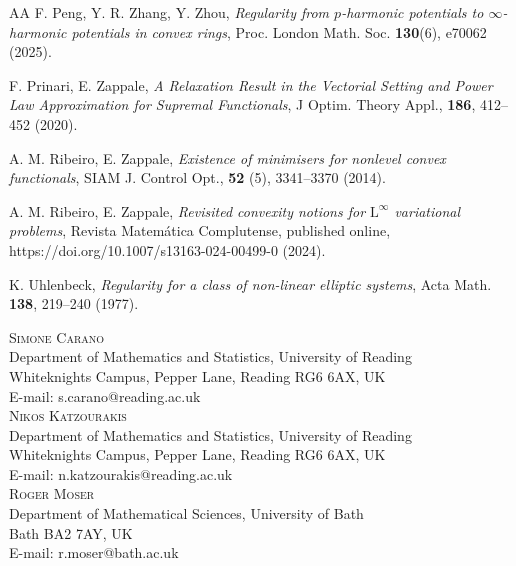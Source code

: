 \documentclass[a4paper,11pt]{article}
\numberwithin{equation}{section}
\theoremstyle{definition}
\begin{document}
\begin{thebibliography}{AA}
F. Peng, Y. R. Zhang, Y. Zhou, \emph{Regularity from $p$-harmonic potentials to $\infty$-harmonic potentials in convex rings}, Proc. London Math. Soc.
\textbf{130}(6), e70062 (2025).

 F. Prinari, E. Zappale, \emph{A Relaxation Result in the Vectorial Setting and Power Law Approximation for Supremal Functionals}, J Optim. Theory Appl., \textbf{186}, 412--452 (2020).

 A. M. Ribeiro, E. Zappale, \emph{Existence of minimisers for nonlevel convex functionals}, SIAM J. Control Opt., \textbf{52} (5), 3341--3370 (2014).

  A. M. Ribeiro, E. Zappale, \emph{Revisited convexity notions for $\mathrm L^\infty$ variational problems}, Revista Matem\'atica Complutense, published online, https://doi.org/10.1007/s13163-024-00499-0 (2024).
  
K. Uhlenbeck, {\it Regularity for a class of non-linear elliptic systems}, Acta Math. {\bf138}, 219--240 (1977).

\end{thebibliography}

\vspace{3mm}
\textsc{Simone Carano}\\
Department of Mathematics and Statistics, University of Reading\\
Whiteknights Campus, Pepper Lane, Reading RG6 6AX, UK\\
E-mail: s.carano@reading.ac.uk\\

\textsc{Nikos Katzourakis}\\
Department of Mathematics and Statistics, University of Reading\\
Whiteknights Campus, Pepper Lane, Reading RG6 6AX, UK\\
E-mail: n.katzourakis@reading.ac.uk\\

\textsc{Roger Moser}\\
Department of Mathematical Sciences, University of Bath\\
Bath BA2 7AY, UK\\
E-mail: r.moser@bath.ac.uk
\end{document}
